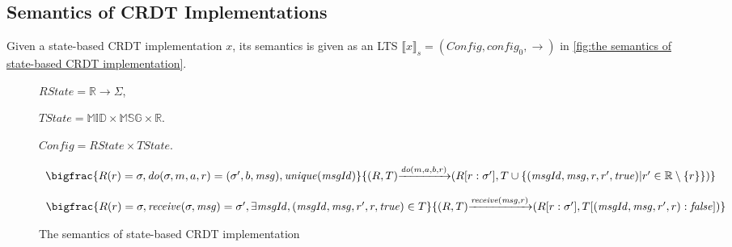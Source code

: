 \subsection{Semantics of CRDT Implementations}
\label{subsec:CRDT implementations} 

 Given a state-based CRDT implementation $x$, its semantics is given as an LTS $\llbracket x \rrbracket_{s} = (\mathit{Config},\mathit{config}_0,\rightarrow)$ in \autoref{fig:the semantics of state-based CRDT implementation}. 

\begin{figure}[ht]
$\mathit{RState} = \mathbb{R} \rightarrow \Sigma$, 

$\mathit{TState} = \mathbb{MID} \times \mathbb{MSG} \times \mathbb{R}$. 

$\mathit{Config} = \mathit{RState} \times \mathit{TState}$. 


\[
\begin{array}{l c}
\bigfrac{ R(r) = \sigma, \mathit{do}(\sigma,m,a,r) = (\sigma',b,\mathit{msg}), \mathit{unique}(\mathit{msgId}) }
{ (R,T) {\xrightarrow{\mathit{do}(m,a,b,r)}} (R[r:\sigma'],T \cup \{ (\mathit{msgId},\mathit{msg},r,r',\mathit{true}) \vert r' \in \mathbb{R} \setminus \{ r \} \}) }
\end{array}
\]

\[
\begin{array}{l c}
\bigfrac{ R(r) = \sigma, \mathit{receive}(\sigma,\mathit{msg}) = \sigma', \exists \mathit{msgId},(\mathit{msgId},\mathit{msg},r',r,\mathit{true}) \in T }
{ (R,T) {\xrightarrow{\mathit{receive}(\mathit{msg},r)}} (R[r:\sigma'],T[(\mathit{msgId},\mathit{msg},r',r):\mathit{false}]) }
\end{array}
\]
\caption{The semantics of state-based CRDT implementation}
\label{fig:the semantics of state-based CRDT implementation}
\end{figure} 



